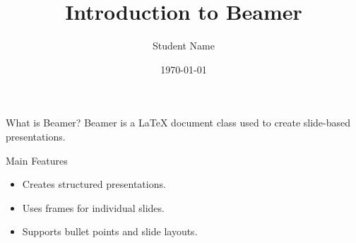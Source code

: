 \documentclass{beamer}
\title{Introduction to Beamer}
\author{Student Name}
\date{\today}
\begin{document}
\begin{frame}
  \titlepage
\end{frame}
\begin{frame}{What is Beamer?}
  Beamer is a LaTeX document class used to create slide-based presentations.
\end{frame}
\begin{frame}{Main Features}
  \begin{itemize}
    \item Creates structured presentations.
    \item Uses frames for individual slides.
    \item Supports bullet points and slide layouts.
  \end{itemize}
\end{frame}
\end{document}
